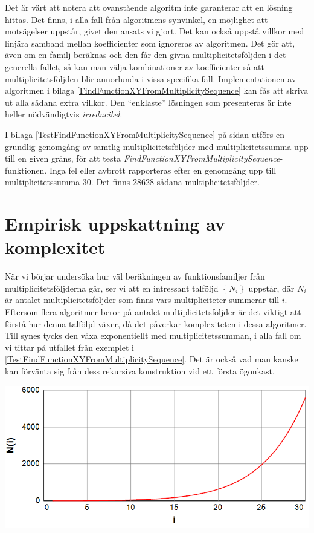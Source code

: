 Det är värt att notera att ovanstående algoritm inte garanterar att en lösning hittas. Det finns, i alla fall från algoritmens synvinkel, en möjlighet att motsägelser uppstår, givet den ansats vi gjort. Det kan också uppstå villkor med linjära samband mellan koefficienter som ignoreras av algoritmen. Det gör att, även om en familj beräknas och den får den givna multiplicitetsföljden i det generella fallet, så kan man välja kombinationer av koefficienter så att multiplicitetsföljden blir annorlunda i vissa specifika fall. Implementationen av algoritmen i bilaga \ref{FindFunctionXYFromMultiplicitySequence} kan fås att skriva ut alla sådana extra villkor. Den ``enklaste'' lösningen som presenteras är inte heller nödvändigtvis \emph{irreducibel}.

I bilaga \ref{TestFindFunctionXYFromMultiplicitySequence} på sidan \pageref{TestFindFunctionXYFromMultiplicitySequence} utförs en grundlig genomgång av samtlig multiplicitetsföljder med multiplicitetssumma upp till en given gräns, för att testa \emph{FindFunctionXYFromMultiplicitySequence}-funktionen. Inga fel eller avbrott rapporteras efter en genomgång upp till multiplicitetssumma 30. Det finns 28628 sådana multiplicitetsföljder.

\section{Empirisk uppskattning av komplexitet}

När vi börjar undersöka hur väl beräkningen av funktionsfamiljer från multiplicitetsföljderna går, ser vi att en intressant talföljd $\left\{N_i\right\}$ uppstår, där $N_i$ är antalet multiplicitetsföljder som finns vars multipliciteter summerar till $i$. Eftersom flera algoritmer beror på antalet multiplicitetsföljder är det viktigt att förstå hur denna talföljd växer, då det påverkar komplexiteten i dessa algoritmer. Till synes tycks den växa exponentiellt med multiplicitetssumman, i alla fall om vi tittar på utfallet från exemplet i \ref{TestFindFunctionXYFromMultiplicitySequence}. Det är också vad man kanske kan förvänta sig från dess rekursiva konstruktion vid ett första ögonkast.

\begin{center}
\includegraphics[scale=0.5]{Export/Complexity1.png}
\end{center}

